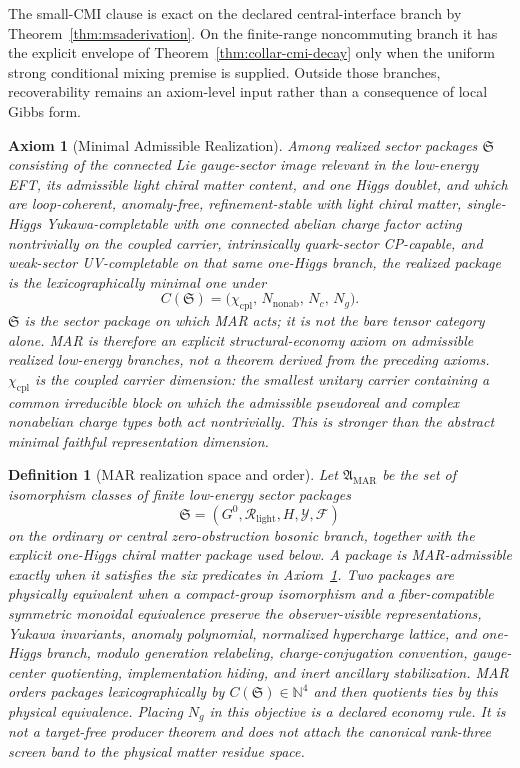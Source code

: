\documentclass[11pt]{article}
\newtheorem{definition}[theorem]{Definition}
\newtheorem{axiom}{Axiom}
\begin{document}
The small-CMI clause is exact on the declared central-interface branch by
Theorem~\ref{thm:msaderivation}. On the finite-range noncommuting branch it has the explicit
envelope of Theorem~\ref{thm:collar-cmi-decay} only when the uniform strong conditional mixing
premise is supplied. Outside those branches, recoverability remains an axiom-level input rather
than a consequence of local Gibbs form.

\begin{axiom}[Minimal Admissible Realization]\label{ax:mar}
Among realized sector packages \(\mathfrak S\) consisting of the connected Lie gauge-sector image relevant in the low-energy EFT, its admissible light chiral matter content, and one Higgs doublet, and which are loop-coherent, anomaly-free, refinement-stable with light chiral matter, single-Higgs Yukawa-completable with one connected abelian charge factor acting nontrivially on the coupled carrier, intrinsically quark-sector CP-capable, and weak-sector UV-completable on that same one-Higgs branch, the realized package is the lexicographically minimal one under
\[
C(\mathfrak S)=\bigl(\chi_{\mathrm{cpl}},\,N_{\mathrm{nonab}},\,N_c,\,N_g\bigr).
\]
\(\mathfrak S\) is the sector package on which MAR acts; it is not the bare tensor category alone. MAR is therefore an explicit structural-economy axiom on admissible realized low-energy branches, not a theorem derived from the preceding axioms. \(\chi_{\mathrm{cpl}}\) is the coupled carrier dimension: the smallest unitary carrier containing a common irreducible block on which the admissible pseudoreal and complex nonabelian charge types both act nontrivially. This is stronger than the abstract minimal faithful representation dimension.
\end{axiom}

\begin{definition}[MAR realization space and order]\label{def:mar-space}
Let \(\mathfrak A_{\mathrm{MAR}}\) be the set of isomorphism classes of finite low-energy sector packages
\[
\mathfrak S=(G^0,\mathcal R_{\mathrm{light}},H,\mathcal Y,\mathcal F)
\]
on the ordinary or central zero-obstruction bosonic branch, together with the explicit one-Higgs chiral matter package used below. A package is MAR-admissible exactly when it satisfies the six predicates in Axiom~\ref{ax:mar}. Two packages are physically equivalent when a compact-group isomorphism and a fiber-compatible symmetric monoidal equivalence preserve the observer-visible representations, Yukawa invariants, anomaly polynomial, normalized hypercharge lattice, and one-Higgs branch, modulo generation relabeling, charge-conjugation convention, gauge-center quotienting, implementation hiding, and inert ancillary stabilization. MAR orders packages lexicographically by \(C(\mathfrak S)\in\mathbb N^4\) and then quotients ties by this physical equivalence. Placing \(N_g\) in this objective is a declared economy rule. It is not a target-free producer theorem and does not attach the canonical rank-three screen band to the physical matter residue space.
\end{definition}
\end{document}
